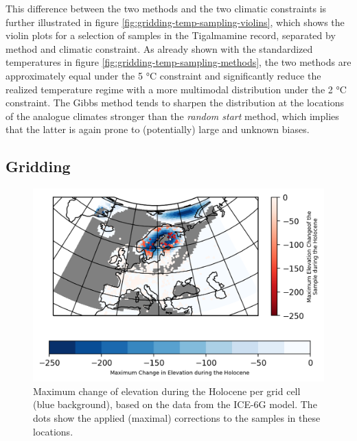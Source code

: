 \begin{refsection}
This difference between the two methods and the two climatic constraints is further illustrated in figure \ref{fig:gridding-temp-sampling-violins}, which shows the violin plots for a selection of samples in the Tigalmamine record, separated by method and climatic constraint. As already shown with the standardized temperatures in figure \ref{fig:gridding-temp-sampling-methods}, the two methods are approximately equal under the 5 °C constraint and significantly reduce the realized temperature regime with a more multimodal distribution under the 2 °C constraint. The Gibbs method tends to sharpen the distribution at the locations of the analogue climates stronger than the \textit{random start} method, which implies that the latter is again prone to (potentially) large and unknown biases. 

\subsection{Gridding}  \label{sec:gridding-gridding}

\begin{figure}
	\includegraphics[width=\linewidth]{gridding-figures/elevation-difference.png}
	\caption[Elevation difference and corrections]{Maximum change of elevation during the Holocene per grid cell (blue background), based on the data from the ICE-6G model. The dots show the applied (maximal) corrections to the samples in these locations. }
	\label{fig:gridding-elev-correction}
\end{figure}


\end{refsection}
